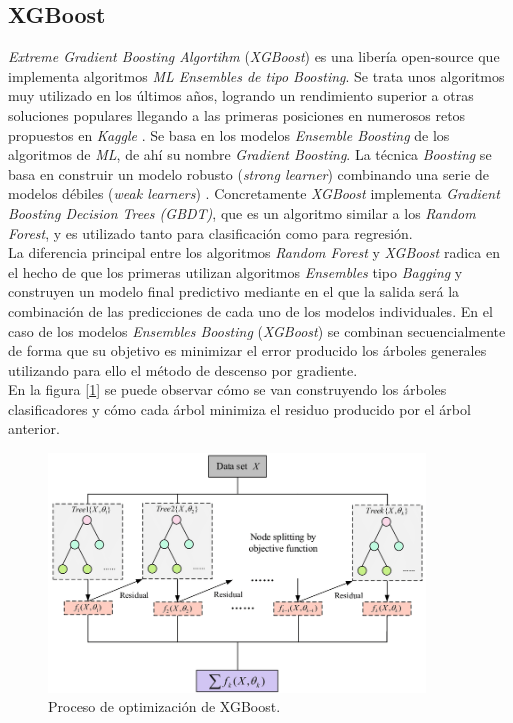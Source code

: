         \subsection {XGBoost}

            
            \textit{Extreme Gradient Boosting Algortihm} (\textit{XGBoost}) es una libería open-source que implementa algoritmos \textit{ML Ensembles de tipo Boosting}. Se trata unos algoritmos muy utilizado en los últimos años, logrando un rendimiento superior a otras soluciones populares llegando a las primeras posiciones en numerosos retos propuestos en \textit{Kaggle} \cite{XGBoostTutorial}. Se basa en los modelos \textit{Ensemble Boosting} de los algoritmos de \textit{ML}, de ahí su nombre \textit{Gradient Boosting}. La técnica \textit{Boosting} se basa en construir un modelo robusto (\textit{strong learner}) combinando una serie de modelos débiles (\textit{weak learners}) \cite{NvidiaXGBoost}. Concretamente \textit{XGBoost} implementa \textit{Gradient Boosting Decision Trees (GBDT)}, que es un algoritmo similar a los \textit{Random Forest}, y es utilizado tanto para clasificación como para regresión.\\

            La diferencia principal entre los algoritmos \textit{Random Forest} y \textit{XGBoost} radica en el hecho de que los primeras utilizan algoritmos \textit{Ensembles} tipo \textit{Bagging} y construyen un modelo final predictivo mediante en el que la salida será la combinación de las predicciones de cada uno de los modelos individuales. En el caso de los modelos \textit{Ensembles Boosting} (\textit{XGBoost}) se combinan secuencialmente de forma que su objetivo es minimizar el error producido los árboles generales utilizando para ello el método de descenso por gradiente.\\


            En la figura [\ref{XGBoostFlowImage}] se puede observar cómo se van construyendo los árboles clasificadores y cómo cada árbol minimiza el residuo producido por el árbol anterior.\\


            \begin{figure}[h]
                \centering
                \includegraphics[width=10cm]{archivos/3.Tecnologias/XGBoost/XGBoostFlowImage}
                \caption{Proceso de optimización de XGBoost.}
                \label{XGBoostFlowImage}
             \end{figure}

